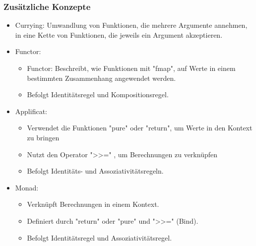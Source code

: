 \documentclass{beamer}
\begin{document}
\begin{frame}
\frametitle{Zusätzliche Konzepte }
	\begin{itemize}
			\item Currying: Umwandlung von Funktionen, die mehrere Argumente annehmen, in eine Kette von Funktionen, die jeweils ein Argument akzeptieren.
			\item Functor: \begin{itemize}
			    \item Functor: Beschreibt, wie Funktionen mit "fmap",  auf Werte in einem bestimmten Zusammenhang angewendet werden.
                    \item  Befolgt Identitätsregel und Kompositionsregel.
			\end{itemize}
                \item Applificat: \begin{itemize}
                    \item Verwendet die Funktionen   "pure" oder "return", um Werte in den Kontext zu bringen
                    \item Nutzt den Operator ">>=" , um Berechnungen zu verknüpfen
                    \item Befolgt Identitäts- und Assoziativitätsregeln.
                \end{itemize}
                \item Monad: \begin{itemize}
                    \item Verknüpft Berechnungen in einem Kontext.
                    \item Definiert durch "return" oder "pure" und ">>=" (Bind).
                    \item Befolgt Identitätsregel und Assoziativitätsregel.
                \end{itemize}
	\end{itemize}

\end{frame}
\end{document}
